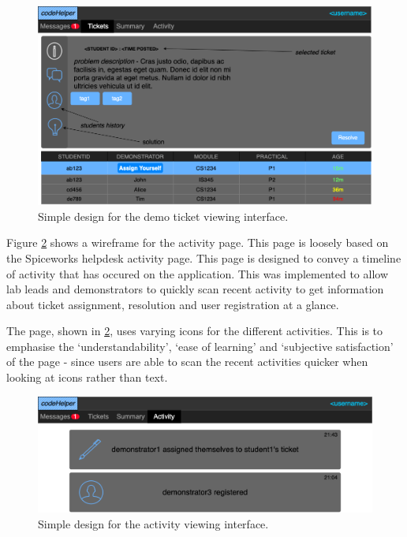 \begin{figure}[H]
    \centering
    \includegraphics[width=\textwidth]{7design/images/revisedDemoTickets.png}
    \caption{Simple design for the demo ticket viewing interface.}
    \label{fig:demoTickets}
\end{figure}

Figure \ref{fig:demoActivity} shows a wireframe for the activity page. This page is loosely based on the Spiceworks helpdesk activity page. This page is designed to convey a timeline of activity that has occured on the application. This was implemented to allow lab leads and demonstrators to quickly scan recent activity to get information about ticket assignment, resolution and user registration at a glance. 

The page, shown in \ref{fig:demoActivity}, uses varying icons for the different activities. This is to emphasise the `understandability', `ease of learning' and `subjective satisfaction' of the page - since users are able to scan the recent activities quicker when looking at icons rather than text.

\begin{figure}[H]
    \centering
    \includegraphics[width=\textwidth]{7design/images/activityDemo.png}
    \caption{Simple design for the activity viewing interface.}
    \label{fig:demoActivity}
\end{figure}

